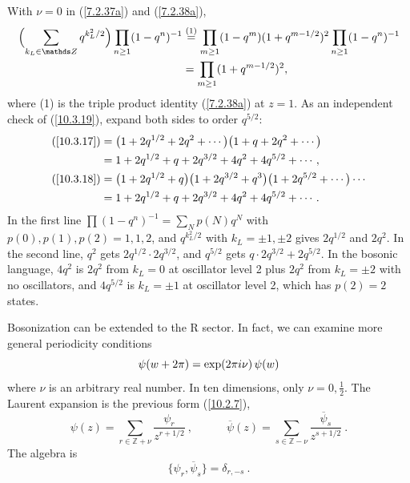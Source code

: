 	\begin{tcolorbox}[breakable]
		\begin{remark}
			With $\nu=0$ in (\ref{7.2.37a}) and (\ref{7.2.38a}),
			\begin{align*}
				\Bigl(\sum_{k_L\in\mathds Z}q^{k_L^{2}/2}\Bigr)\prod_{n\ge1}(1-q^{n})^{-1}
				&\eqs{1}\prod_{m\ge1}(1-q^{m})(1+q^{m-1/2})^{2}\prod_{n\ge1}(1-q^{n})^{-1}\\
				&=\prod_{m\ge1}(1+q^{m-1/2})^{2} ,
			\end{align*}
			where (1) is the triple product identity (\ref{7.2.38a}) at $z=1$. As an independent check of (\ref{10.3.19}), expand both sides to order $q^{5/2}$:
			\begin{align*}
				(\ref{10.3.17})&=\bigl(1+2q^{1/2}+2q^{2}+\cdots\bigr)\bigl(1+q+2q^{2}+\cdots\bigr)\\
				&=1+2q^{1/2}+q+2q^{3/2}+4q^{2}+4q^{5/2}+\cdots,\\
				(\ref{10.3.18})&=\bigl(1+2q^{1/2}+q\bigr)\bigl(1+2q^{3/2}+q^{3}\bigr)\bigl(1+2q^{5/2}+\cdots\bigr)\cdots\\
				&=1+2q^{1/2}+q+2q^{3/2}+4q^{2}+4q^{5/2}+\cdots .
			\end{align*}
			In the first line $\prod(1-q^n)^{-1}=\sum_Np(N)q^N$ with $p(0),p(1),p(2)=1,1,2$, and $q^{k_L^2/2}$ with $k_L=\pm1,\pm2$ gives $2q^{1/2}$ and $2q^{2}$. In the second line, $q^{2}$ gets $2q^{1/2}\cdot2q^{3/2}$, and $q^{5/2}$ gets $q\cdot2q^{3/2}+2q^{5/2}$. In the bosonic language, $4q^{2}$ is $2q^{2}$ from $k_L=0$ at oscillator level 2 plus $2q^{2}$ from $k_L=\pm2$ with no oscillators, and $4q^{5/2}$ is $k_L=\pm1$ at oscillator level 2, which has $p(2)=2$ states.
		\end{remark}
	\end{tcolorbox}
	
	Bosonization can be extended to the R sector. In fact, we can examine more general periodicity conditions
	\begin{equation}
		\psi(w+2\pi) = \exp (2\pi i\nu) \,\psi(w) \label{10.3.20}
	\end{equation}
	where $\nu$ is an arbitrary real number. In ten dimensions, only $\nu=0,\frac{1}{2}$. The Laurent expansion is the previous form (\ref{10.2.7}),
	\begin{equation}
		\psi(z)=\sum_{r\in \mathds{Z}+\nu}\frac{\psi_{r}}{z^{r+1/2}} \:, \qquad\quad 
		\overline{\psi}(z)=\sum_{s\in\mathds{Z}-\nu}\frac{\overline{\psi}_{s}}{z^{s+1/2}}\:.
	\end{equation}
	The algebra is
	\begin{equation}
		\{\psi_{r},\overline{\psi}_{s}\} =\delta_{r,-s} \:. \label{10.3.22}
	\end{equation}
	

